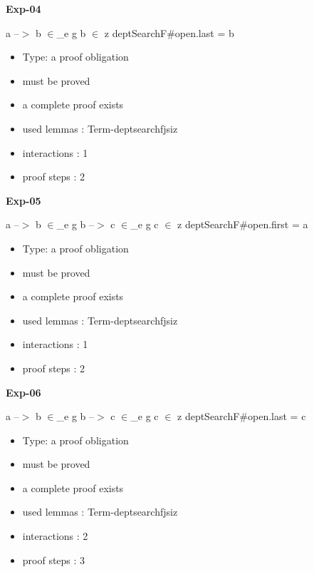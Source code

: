 \documentclass[a4paper]{article}
\begin{document}
\medskip

{\LARGE\bf Exp-04}\label{lemma-Exp-04}

\medskip

 \Fol a --$>$ b $\in$\_e g \And b $\in$ z \Imp \Do deptSearchF\#\Dc open.last = b

\begin{itemize}

\item Type: a proof obligation

\item       must be proved
\item       a complete proof exists
\item       used lemmas  : Term-deptsearchfjsiz
\item       interactions : 1
\item       proof steps  : 2
\end{itemize}

\medskip

{\LARGE\bf Exp-05}\label{lemma-Exp-05}

\medskip

 \Fol a --$>$ b $\in$\_e g \And b --$>$ c $\in$\_e g \And c $\in$ z \Imp \Do deptSearchF\#\Dc open.first = a

\begin{itemize}

\item Type: a proof obligation

\item       must be proved
\item       a complete proof exists
\item       used lemmas  : Term-deptsearchfjsiz
\item       interactions : 1
\item       proof steps  : 2
\end{itemize}

\medskip

{\LARGE\bf Exp-06}\label{lemma-Exp-06}

\medskip

 \Fol a --$>$ b $\in$\_e g \And b --$>$ c $\in$\_e g \And c $\in$ z \Imp \Do deptSearchF\#\Dc open.last = c

\begin{itemize}

\item Type: a proof obligation

\item       must be proved
\item       a complete proof exists
\item       used lemmas  : Term-deptsearchfjsiz
\item       interactions : 2
\item       proof steps  : 3
\end{itemize}

\medskip
\end{document}
